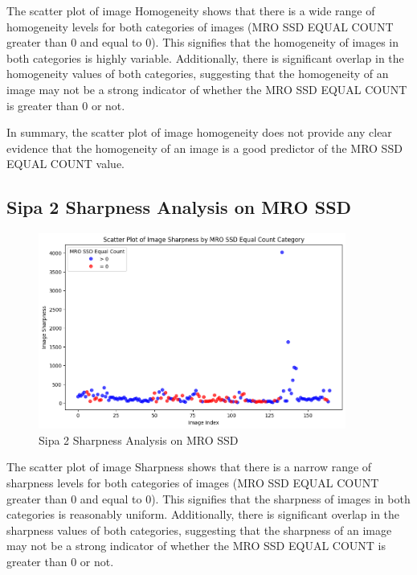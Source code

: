 The scatter plot of image Homogeneity shows that there is a wide range of homogeneity levels for both categories of images (MRO SSD EQUAL COUNT greater than 0 and equal to 0). This signifies that the homogeneity of images in both categories is highly variable. Additionally, there is significant overlap in the homogeneity values of both categories, suggesting that the homogeneity of an image may not be a strong indicator of whether the MRO SSD EQUAL COUNT is greater than 0 or not.



In summary, the scatter plot of image homogeneity does not provide any clear evidence that the homogeneity of an image is a good predictor of the MRO SSD EQUAL COUNT value.

\newpage

\subsection{Sipa 2 Sharpness Analysis on MRO SSD}


\begin{figure}[ht]
    \centering
    \includegraphics[width=0.9\textwidth]{Figures/Results/sipa_02/sharpness.png}
    \caption[Sipa 2 Sharpness Analysis on MRO SSD]{Sipa 2 Sharpness Analysis on MRO SSD}
    \label{fig:Sipa 2 Sharpness Analysis on MRO SSD}
\end{figure}



The scatter plot of image Sharpness shows that there is a narrow range of sharpness levels for both categories of images (MRO SSD EQUAL COUNT greater than 0 and equal to 0). This signifies that the sharpness of images in both categories is reasonably uniform. Additionally, there is significant overlap in the sharpness values of both categories, suggesting that the sharpness of an image may not be a strong indicator of whether the MRO SSD EQUAL COUNT is greater than 0 or not.

